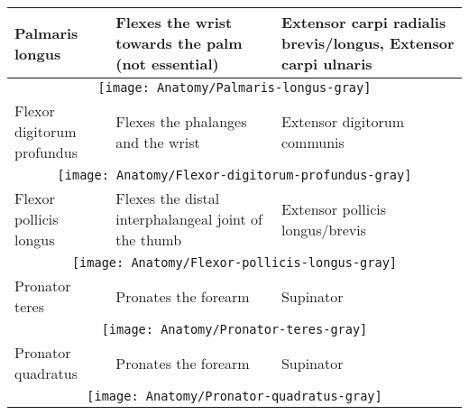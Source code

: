 \documentclass[main]{subfiles}
\begin{document}
\begin{longtable}{p{3.2cm}p{5.5cm}|l}
Palmaris longus & Flexes the wrist towards the palm (not essential) &  Extensor carpi radialis brevis/longus, Extensor carpi ulnaris\\*
\hline
\multicolumn{3}{c}{\texttt{[image: Anatomy/Palmaris-longus-gray]}}\\
\hline


Flexor digitorum profundus & Flexes the phalanges and the wrist & Extensor digitorum communis \\*
\hline
\multicolumn{3}{c}{\texttt{[image: Anatomy/Flexor-digitorum-profundus-gray]}}\\
\hline

Flexor pollicis longus & Flexes the distal interphalangeal joint of the thumb & Extensor pollicis longus/brevis\\*
\hline
\multicolumn{3}{c}{\texttt{[image: Anatomy/Flexor-pollicis-longus-gray]}}\\
\hline

Pronator teres & Pronates the forearm & Supinator\\*
\hline
\multicolumn{3}{c}{\texttt{[image: Anatomy/Pronator-teres-gray]}}\\
\hline

Pronator quadratus & Pronates the forearm & Supinator \\*
\hline
\multicolumn{3}{c}{\texttt{[image: Anatomy/Pronator-quadratus-gray]}}\\
\hline

\end{longtable}
\end{document}
